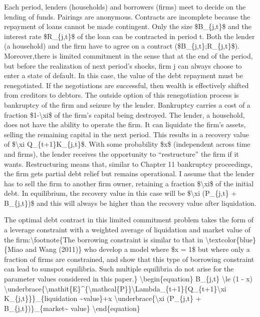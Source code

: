 \documentclass[10pt,math=newtx,citestyle=gb7714-2015,bibstyle=gb7714-2015]{elegantbook}
\begin{document}
	Each period, lenders (households) and borrowers (firms) meet to decide on the lending of funds. Pairings are anonymous. Contracts are incomplete because the repayment of loans cannot be made contingent. Only the size \$B\_\{j,t\}\$ and the interest rate \$R\_\{j,t\}\$ of the loan can be contracted in period t. Both the lender (a household) and the firm have to agree on a contract (\$B\_\{j,t\};R\_\{j,t\}\$). Moreover,there is limited commitment in the sense that at the end of the period, but before the realization of next period's shocks, firm j can always choose to enter a state of default. In this case, the value of the debt repayment must be renegotiated. If the negotiations are successful, then wealth is effectively shifted from creditors to debtors. The outside option of this renegotiation process is bankruptcy of the firm and seizure by the lender. Bankruptcy carries a cost of a fraction \$1-\textbackslash{}xi\$ of the firm's capital being destroyed. The lender, a household, does not have the ability to operate the firm. It can liquidate the firm's assets, selling the remaining capital in the next period. This results in a recovery value of \$\textbackslash{}xi Q\_\{t+1\}K\_\{j,t\}\$. With some probability \$x\$ (independent across time and firms), the lender receives the opportunity to ``restructure'' the firm if it wants. Restructuring means that, similar to Chapter 11 bankruptcy proceedings, the firm gets partial debt relief but remains operational. I assume that the lender has to sell the firm to another firm owner, retaining a fraction \$\textbackslash{}xi\$ of the initial debt. In equilibrium, the recovery value in this case will be \$\textbackslash{}xi (P\_\{j,t\} + B\_\{j,t\})\$
	and this will always be higher than the recovery value after liquidation.
	
	The optimal debt contract in this limited commitment problem takes the form of a leverage constraint with a weighted average of liquidation and market value of
	the firm:\textbackslash{}footnote\{The borrowing constraint is similar to that in \textbackslash{}textcolor\{blue\}\{Miao and Wang (2011)\} who develop a model where \$x = 1\$ but where only a fraction of firms are constrained, and show that this type of borrowing constraint can lead to sunspot equilibria. Such multiple equilibria do not arise for the parameter values considered in this paper.\}
	\textbackslash{}begin\{equation\}
	B\_\{j,t\} \textbackslash{}le (1 - x) \textbackslash{}underbrace\{\textbackslash{}mathit\{E\}\^{}\{\textbackslash{}mathcal\{P\}\}\textbackslash{}Lambda\_\{t+1\}\{Q\_\{t+1\}\textbackslash{}xi K\_\{j,t\}\}\}\_\{liquidation \~{}value\}+x \textbackslash{}underbrace\{\textbackslash{}xi (P\_\{j,t\} + B\_\{j,t\})\}\_\{market\~{} value\}
	\textbackslash{}end\{equation\}
	
\end{document}
